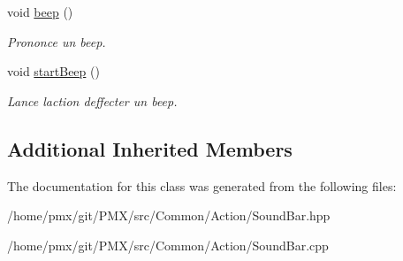 \begin{DoxyCompactItemize}
void \hyperlink{classSoundBar_a2e65477237a7d48295d638f5b478a72c}{beep} ()
\begin{DoxyCompactList}\small\item\em Prononce un beep. \end{DoxyCompactList}\item 
\mbox{\label{classSoundBar_a6ca072c4dc05e392f0c0114b483f8dc2}} 
void \hyperlink{classSoundBar_a6ca072c4dc05e392f0c0114b483f8dc2}{start\+Beep} ()
\begin{DoxyCompactList}\small\item\em Lance l\textquotesingle{}action d\textquotesingle{}effecter un beep. \end{DoxyCompactList}\end{DoxyCompactItemize}
\subsection*{Additional Inherited Members}


The documentation for this class was generated from the following files\+:\begin{DoxyCompactItemize}
\item 
/home/pmx/git/\+P\+M\+X/src/\+Common/\+Action/Sound\+Bar.\+hpp\item 
/home/pmx/git/\+P\+M\+X/src/\+Common/\+Action/Sound\+Bar.\+cpp\end{DoxyCompactItemize}
